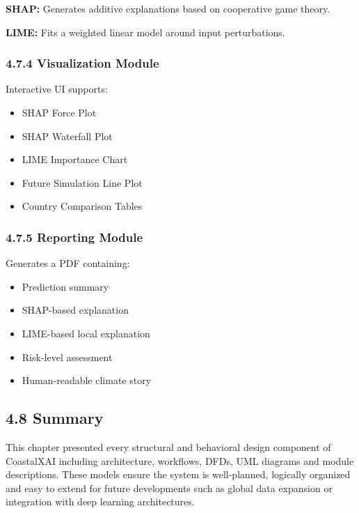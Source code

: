 \documentclass[12pt, a4paper]{article}
\begin{document}
\textbf{SHAP:}
Generates additive explanations based on cooperative game theory.

\textbf{LIME:}
Fits a weighted linear model around input perturbations.

\subsubsection{\textbf{4.7.4 Visualization Module}}

Interactive UI supports:

\begin{itemize}
    \item SHAP Force Plot
    \item SHAP Waterfall Plot
    \item LIME Importance Chart
    \item Future Simulation Line Plot
    \item Country Comparison Tables
\end{itemize}

\subsubsection{\textbf{4.7.5 Reporting Module}}

Generates a PDF containing:
\begin{itemize}
    \item Prediction summary
    \item SHAP-based explanation
    \item LIME-based local explanation
    \item Risk-level assessment
    \item Human-readable climate story
\end{itemize}

\subsection{\textbf{4.8 Summary}}

This chapter presented every structural and behavioral design component of CoastalXAI including architecture, workflows, DFDs, UML diagrams and module descriptions. These models ensure the system is well-planned, logically organized and easy to extend for future developments such as global data expansion or integration with deep learning architectures.
\end{document}
